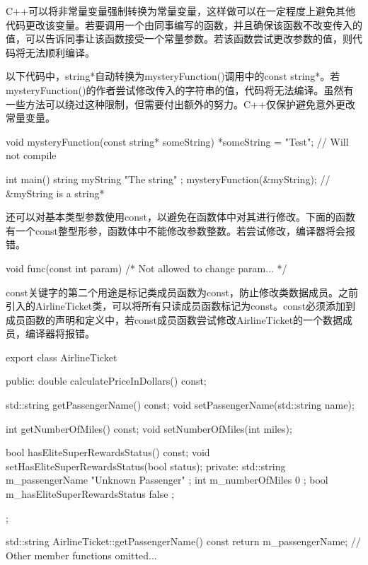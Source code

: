 
C++可以将非常量变量强制转换为常量变量，这样做可以在一定程度上避免其他代码更改该变量。若要调用一个由同事编写的函数，并且确保该函数不改变传入的值，可以告诉同事让该函数接受一个常量参数。若该函数尝试更改参数的值，则代码将无法顺利编译。

以下代码中，string*自动转换为mysteryFunction()调用中的const string*。若mysteryFunction()的作者尝试修改传入的字符串的值，代码将无法编译。虽然有一些方法可以绕过这种限制，但需要付出额外的努力。C++仅保护避免意外更改常量变量。


\begin{cpp}
void mysteryFunction(const string* someString)
{
    *someString = "Test"; // Will not compile
}

int main()
{
    string myString { "The string" };
    mysteryFunction(&myString); // &myString is a string*
}
\end{cpp}

还可以对基本类型参数使用const，以避免在函数体中对其进行修改。下面的函数有一个const整型形参，函数体中不能修改参数整数。若尝试修改，编译器将会报错。

\begin{cpp}
void func(const int param) { /* Not allowed to change param... */ }
\end{cpp}


const关键字的第二个用途是标记类成员函数为const，防止修改类数据成员。之前引入的AirlineTicket类，可以将所有只读成员函数标记为const。const必须添加到成员函数的声明和定义中，若const成员函数尝试修改AirlineTicket的一个数据成员，编译器将报错。

\begin{cpp}
export class AirlineTicket
{
    public:
        double calculatePriceInDollars() const;

        std::string getPassengerName() const;
        void setPassengerName(std::string name);

        int getNumberOfMiles() const;
        void setNumberOfMiles(int miles);

        bool hasEliteSuperRewardsStatus() const;
        void setHasEliteSuperRewardsStatus(bool status);
    private:
        std::string m_passengerName { "Unknown Passenger" };
        int m_numberOfMiles { 0 };
        bool m_hasEliteSuperRewardsStatus { false };
};

std::string AirlineTicket::getPassengerName() const
{
    return m_passengerName;
}
// Other member functions omitted...
\end{cpp}

